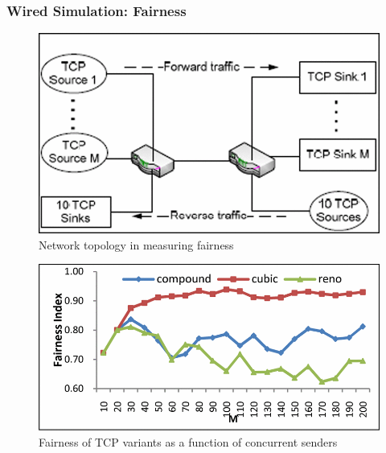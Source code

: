 \documentclass{beamer}
\begin{document}
\begin{frame}
\frametitle{Wired Simulation: Fairness}
\begin{figure}
	\includegraphics[height=0.3\textheight]{images/abdeljaouad10_topology_2.png}
	\caption{Network topology in measuring fairness}
\end{figure}

\begin{figure}
	\includegraphics[height=0.3\textheight]{images/abdeljaouad10_fairness_1.png}
	\caption{Fairness of TCP variants as a function of concurrent senders}
\end{figure}
\end{frame}
\end{document}
